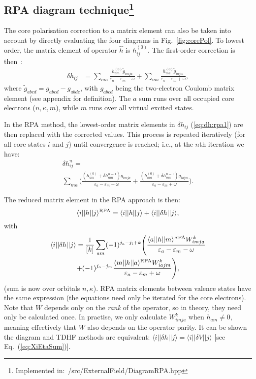 \documentclass[10pt,twocolumn,a4paper]{article}%
\newcommand{\bra}[1]{\ensuremath{\langle #1|}}	%
\newcommand{\ket}[1]{\ensuremath{|#1\rangle}}
\newcommand{\be}{\begin{equation}}
\newcommand{\ee}{\end{equation}}
\def\en{\ensuremath{\varepsilon}}
\renewcommand{\k}{\ensuremath{\kappa}}
\begin{document}
\subsection[RPA diagram technique]{RPA diagram technique\footnote{Implemented in:~/src/ExternalField/DiagramRPA.hpp}\label{sec:RPA-diagram}}

The core polarisation correction to a matrix element can also be taken into account by directly evaluating the four diagrams in Fig.~\ref{fig:corePol}.
To lowest order, the matrix element of operator $\hat h$ is $h_{ij}^{(0)}$. 
The first-order correction is then~\cite{Lindgren1986}:
\begin{align}
\delta h_{ij} &= 
\sum_{ma}\frac{h_{am}^{(0)}\widetilde g_{imja}}{\en_a - \en_m - \omega}
+ \sum_{ma}\frac{h_{ma}^{(0)}\widetilde g_{iajm}}{\en_a - \en_m + \omega},
\label{eq:dh:rpa1}
\end{align}
where
$ \widetilde g_{abcd} =  g_{abcd} -  g_{abdc}$, with 
$g_{abcd}$ being the two-electron Coulomb matrix element (see appendix for definition).
The $a$ sum runs over all occupied core electrons ($n,\k,m$), while $m$ runs over all virtual excited states.

In the RPA method, the lowest-order matrix elements in $\delta h_{ij}$ (\ref{eq:dh:rpa1}) are then replaced with the corrected values. This process is repeated iteratively (for all core states $i$ and $j$) until convergence is reached; i.e., at the $n$th iteration we have:
\begin{multline}
\delta h_{ij}^{n} = \\
\sum_{ma}\Bigg(\frac{(h_{am}^{(0)}+\delta h_{am}^{n-1})\widetilde g_{imja}}{\en_a - \en_m - \omega}
+ \frac{(h_{ma}^{(0)}+\delta h_{ma}^{n-1})\widetilde g_{iajm}}{\en_a - \en_m + \omega}\Bigg).
\end{multline}

The reduced matrix element in the RPA approach is then:
\be
\bra{i}|h|\ket{j}^{\rm RPA} = \bra{i}|h|\ket{j} + \bra{i}|\delta h|\ket{j},
\ee
with
\begin{multline}
\bra{i}|\delta h|\ket{j} = 
\frac{1}{[k]}\sum_{am}(-1)^{j_a-j_i+k}\Bigg(
 \frac{\bra{a}|h|\ket{m}^{\rm RPA}W^k_{imja}}{\en_a-\en_m-\omega}\\
+ (-1)^{j_a-j_m}\frac{\bra{m}|h|\ket{a}^{\rm RPA}W^k_{iajm}}{\en_a-\en_m+\omega}
\Bigg),
\end{multline}
(sum is now over {\rm orbitals $n,\k$}).
RPA matrix elements between valence states have the same expression (the equations need only be iterated for the core electrons).
Note that $W$ depends only on the {\em rank} of the operator, so in theory, they need only be calculated once.
In practise, we only calculate $W^k_{imja}$ when $h_{am}\neq0$, meaning effectively that $W$ also depends on the operator parity.
It can be shown the diagram and TDHF methods are equivalent:
 $\bra{i}|\delta h|\ket{j}=\bra{i}|\delta V|\ket{j}$ [see Eq.~(\ref{eq:XiEtaSum})].
\end{document}
